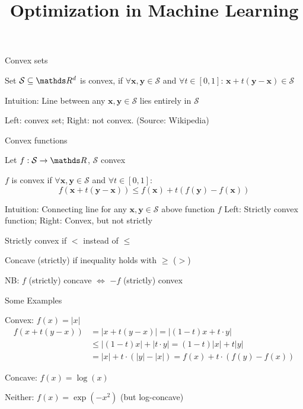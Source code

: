 \documentclass[11pt,compress,t,notes=noshow, xcolor=table]{beamer}
\title{Optimization in Machine Learning}
\begin{document}


\newcommand{\xv}{\bm{x}}
\newcommand{\yv}{\bm{y}}
\renewcommand{\S}{\mathcal{S}}



\begin{framei}{Convex sets}
\item Set $\S \subseteq \R^d$ is convex, if $\forall \xv, \yv \in \S$ and $\forall t \in [0, 1]$:
$\xv + t (\yv - \xv) \in \S$
\item Intuition: Line between any $\xv, \yv \in \S$ lies entirely in $\S$
\item Left: convex set; Right: not convex. (Source: Wikipedia)
\end{framei}

\begin{framei}{Convex functions}
\item Let $f: \S \to \R$, $\S$ convex
\item $f$ is convex if $\forall \xv, \yv \in \S$ and $\forall t \in [0, 1]$:
$$ f(\xv + t(\yv - \xv)) \le f(\xv) + t(f(\mathbf{y}) - f(\xv)) $$
\item Intuition: Connecting line for any $\xv, \yv \in \S$ above function $f$
Left: Strictly convex function; Right: Convex, but not strictly
\item Strictly convex if $<$ instead of $\le$
\item Concave (strictly) if inequality holds with $\ge$ ($>$)
\item NB: $f$ (strictly) concave $\Leftrightarrow$ $-f$ (strictly) convex
\end{framei}

\begin{framei}{Some Examples}
\item Convex: $f(x) = |x|$\\
\begin{align*}
f\left(x + t(y - x)\right) &= |x + t(y - x)| = |(1 - t) x + t \cdot y| \\
& \le |(1 - t) x| + |t \cdot y| = (1 - t) |x| + t |y| \\
&= |x| + t \cdot (|y| - |x|) = f(x) + t \cdot (f(y) - f(x))
\end{align*}
\item Concave: $f(x) = \log(x)$\\
\item Neither: $f(x) = \exp(-x^2)$ (but log-concave)
\end{framei}
\end{document}

